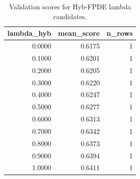 \begin{table}[t]
\caption{Validation scores for Hyb-FPDE lambda candidates.}
\label{tab:lambda_distribution_computed}
\centering
\begin{tabular}{rrr}
\toprule
lambda\_hyb & mean\_score & n\_rows \\
\midrule
0.0000 & 0.6175 & 1 \\
0.1000 & 0.6201 & 1 \\
0.2000 & 0.6205 & 1 \\
0.3000 & 0.6220 & 1 \\
0.4000 & 0.6247 & 1 \\
0.5000 & 0.6277 & 1 \\
0.6000 & 0.6313 & 1 \\
0.7000 & 0.6342 & 1 \\
0.8000 & 0.6373 & 1 \\
0.9000 & 0.6394 & 1 \\
1.0000 & 0.6411 & 1 \\
\bottomrule
\end{tabular}

\end{table}
